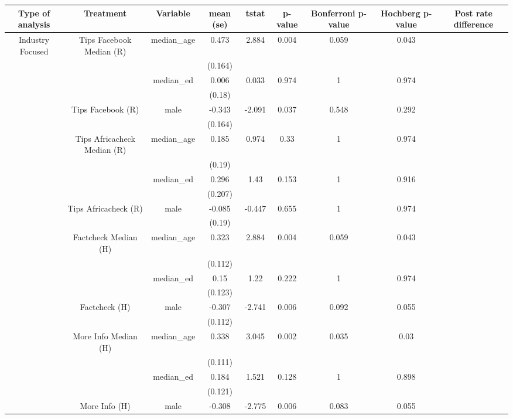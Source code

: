 \begin{tabular}{ccccccccc}
  \hline
Type of analysis & Treatment & Variable & mean (se) & tstat & p-value & Bonferroni p-value & Hochberg p-value & Post rate difference \\ 
  \hline
Industry Focused & Tips Facebook Median (R) & median\_age & 0.473 & 2.884 & 0.004 & 0.059 & 0.043 &  \\ 
   &  &  & (0.164) &  &  &  &  &  \\ 
   &  & median\_ed & 0.006 & 0.033 & 0.974 & 1 & 0.974 &  \\ 
   &  &  & (0.18) &  &  &  &  &  \\ 
   & Tips Facebook (R) & male & -0.343 & -2.091 & 0.037 & 0.548 & 0.292 &  \\ 
   &  &  & (0.164) &  &  &  &  &  \\ 
   & Tips Africacheck Median (R) & median\_age & 0.185 & 0.974 & 0.33 & 1 & 0.974 &  \\ 
   &  &  & (0.19) &  &  &  &  &  \\ 
   &  & median\_ed & 0.296 & 1.43 & 0.153 & 1 & 0.916 &  \\ 
   &  &  & (0.207) &  &  &  &  &  \\ 
   & Tips Africacheck (R) & male & -0.085 & -0.447 & 0.655 & 1 & 0.974 &  \\ 
   &  &  & (0.19) &  &  &  &  &  \\ 
   & Factcheck Median (H) & median\_age & 0.323 & 2.884 & 0.004 & 0.059 & 0.043 &  \\ 
   &  &  & (0.112) &  &  &  &  &  \\ 
   &  & median\_ed & 0.15 & 1.22 & 0.222 & 1 & 0.974 &  \\ 
   &  &  & (0.123) &  &  &  &  &  \\ 
   & Factcheck (H) & male & -0.307 & -2.741 & 0.006 & 0.092 & 0.055 &  \\ 
   &  &  & (0.112) &  &  &  &  &  \\ 
   & More Info Median (H) & median\_age & 0.338 & 3.045 & 0.002 & 0.035 & 0.03 &  \\ 
   &  &  & (0.111) &  &  &  &  &  \\ 
   &  & median\_ed & 0.184 & 1.521 & 0.128 & 1 & 0.898 &  \\ 
   &  &  & (0.121) &  &  &  &  &  \\ 
   & More Info (H) & male & -0.308 & -2.775 & 0.006 & 0.083 & 0.055 &  \\ 

\end{tabular}
